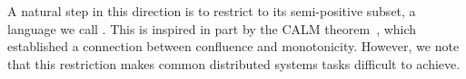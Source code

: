A natural step in this direction is to restrict \lang to its semi-positive subset, a language we call \slang. 
This is inspired in part by the CALM theorem~\cite{cidr11,declarative-imperative,Abiteboul2011}, which established a connection between confluence and monotonicity.  However, we note that this restriction makes common distributed systems tasks difficult to achieve.

